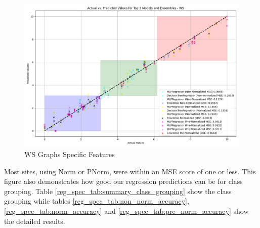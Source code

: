 \documentclass[12pt,letterpaper]{article}
\begin{document}
\begin{figure}[h]
    \centering
    \includegraphics[width=0.95\linewidth]{reg_section_specific/ensemble_learning/actual_vs_predicted_top_3_models_and_ensembles_WS.png}
    \caption{WS Graphs Specific Features}
    \label{reg_spec_fig:ws_ensemble_big}
\end{figure}

Most sites, using Norm or PNorm, were within an MSE score of one or less.
This figure also demonstrates how good our regression predictions can be for class grouping.
Table \ref{reg_spec_tab:summary_class_grouping} show the class grouping while tables \ref{reg_spec_tab:non_norm_accuracy}, \ref{reg_spec_tab:norm_accuracy} and \ref{reg_spec_tab:pre_norm_accuracy} show the detailed results.
\end{document}
